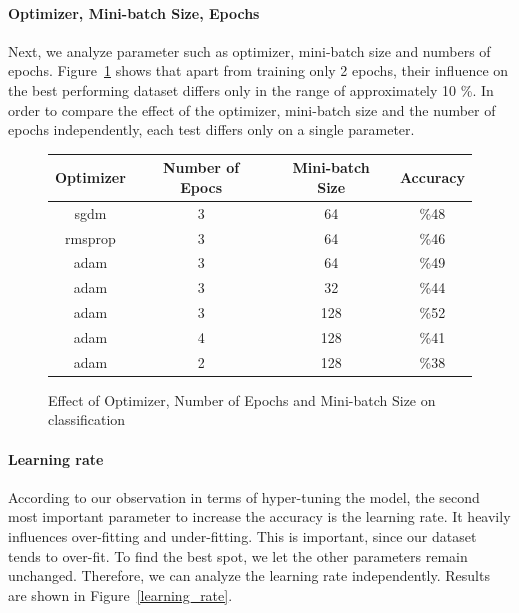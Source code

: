 \documentclass[twocolumn]{article}
\begin{document}
 
\paragraph{Optimizer, Mini-batch Size, Epochs}
Next, we analyze parameter such as optimizer, mini-batch size and numbers of epochs. Figure~\ref{model_param} shows that apart from training only 2 epochs, their influence on the best performing dataset differs only in the range of approximately 10 \%. In order to compare the effect of the optimizer, mini-batch size and the number of epochs independently, each test differs only on a single parameter. 

\begin{figure}
\begin{center}
 \begin{tabular}{|c|c|c|c|}
 \hline
 Optimizer&Number of Epocs&Mini-batch Size&Accuracy\\
 \hline
sgdm & 3 & 64 & \%48 \\
  \hline
rmsprop &   3 & 64 & \%46 \\  
  \hline adam  & 3 & 64 & \%49 \\
    \hline adam  & 3 & 32 & \%44 \\
    \hline adam  & 3 & 128 & \%52 \\
  \hline adam  & 4 & 128 & \%41 \\
  \hline adam  & 2 & 128 & \%38 \\

  \hline
 
\end{tabular}
\caption{Effect of Optimizer, Number of Epochs and Mini-batch Size on classification}
\label{model_param}
\end{center}

\end{figure}

\paragraph{Learning rate}
According to our observation in terms of hyper-tuning the model, the second most important parameter to increase the accuracy is the learning rate. It heavily influences over-fitting and under-fitting. This is important, since our dataset tends to over-fit. To find the best spot, we let the other parameters remain unchanged. Therefore, we can analyze the learning rate independently. Results are shown in Figure~\ref{learning_rate}.
\end{document}
